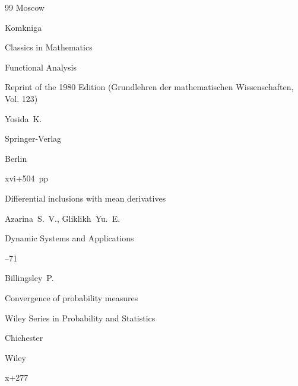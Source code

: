 \begin{thebibliography}{99}
\publaddr Moscow 

\publ Komkniga 








\serial Classics in Mathematics

\book Functional Analysis

\bookinfo Reprint of the 1980 Edition (Grundlehren der mathematischen Wissenschaften, Vol. 123)

\by Yosida~K.


\publ Springer-Verlag 

\publaddr Berlin 

\totalpages xvi+504~pp \nofrills







\paper Differential inclusions with mean derivatives  

\by Azarina~S.~V., Gliklikh~Yu.~E. 

\jour Dynamic Systems and Applications 



--71




\by Billingsley~P.

\book Convergence of probability measures


\serial Wiley Series in Probability and Statistics

\publaddr Chichester

\publ Wiley

\totalpages x+277




\end{thebibliography}



\nopagenumber



\renewcommand{\baselinestretch}{0.9}



\newpage



%

%

